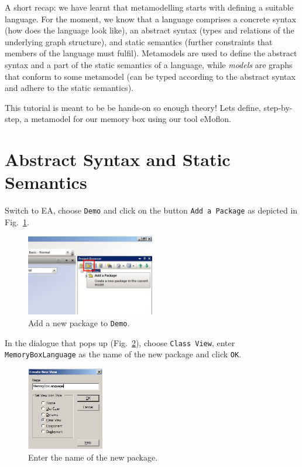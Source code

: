 A short recap:  we have learnt that metamodelling starts with defining a
suitable language.  
For the moment, we know that a language comprises a concrete
syntax (how does the language look like),  an abstract syntax (types and
relations of the underlying graph structure), and static semantics (further
constraints that members of the language must fulfil).
Metamodels are used to define the abstract syntax and a part of the static
semantics of a language, while \emph{models} are graphs that conform to some
metamodel (can be typed  according to the abstract syntax and adhere to the
static semantics). 

This tutorial is meant to be be hands-on so enough theory!  Lets
define, step-by-step, a metamodel for our memory box using our tool eMoflon.  
  
\section{Abstract Syntax and Static Semantics}

Switch to EA, choose \texttt{Demo} and click on the button \texttt{Add a
Package} as depicted in Fig.~\ref{fig:new_package}.   

\begin{figure}[htbp]
	\centering
  \includegraphics[width=0.5\textwidth]{pics/memBox01.png}
	\caption{Add a new package to \texttt{Demo}.}
	\label{fig:new_package}
\end{figure} 

In the dialogue that pops up (Fig.~\ref{fig:new_package_name}), choose
\texttt{Class View}, enter \texttt{Memory\-Box\-Language} as the name of the new
package and click \texttt{OK}. 

\begin{figure}[htbp]
	\centering
  \includegraphics[width=0.3\textwidth]{pics/memBox02.png}
	\caption{Enter the name of the new package.}
	\label{fig:new_package_name}
\end{figure}

